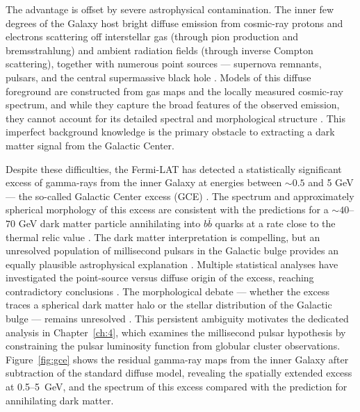 The advantage is offset by severe astrophysical contamination.
The inner few degrees of the Galaxy host bright diffuse emission from cosmic-ray protons and electrons scattering off interstellar gas (through pion production and bremsstrahlung) and ambient radiation fields (through inverse Compton scattering), together with numerous point sources --- supernova remnants, pulsars, and the central supermassive black hole \cite{Hooper:2024,Cirelli:2024ssz}.
Models of this diffuse foreground are constructed from gas maps and the locally measured cosmic-ray spectrum, and while they capture the broad features of the observed emission, they cannot account for its detailed spectral and morphological structure \cite{Hooper:2024}.
This imperfect background knowledge is the primary obstacle to extracting a dark matter signal from the Galactic Center.

Despite these difficulties, the Fermi-LAT has detected a statistically significant excess of gamma-rays from the inner Galaxy at energies between $\sim 0.5$ and 5 GeV --- the so-called Galactic Center excess (GCE) \cite{Goodenough:2009gk,Hooper:2010mq,Daylan:2014rsa,Cirelli:2024ssz}.
The spectrum and approximately spherical morphology of this excess are consistent with the predictions for a $\sim 40$--$70$ GeV dark matter particle annihilating into $b\bar{b}$ quarks at a rate close to the thermal relic value \cite{Cirelli:2024ssz,Daylan:2014rsa}.
The dark matter interpretation is compelling, but an unresolved population of millisecond pulsars in the Galactic bulge provides an equally plausible astrophysical explanation \cite{Cirelli:2024ssz,Pinetti:2021jjs}.
Multiple statistical analyses have investigated the point-source versus diffuse origin of the excess, reaching contradictory conclusions \cite{Cirelli:2024ssz}.
The morphological debate --- whether the excess traces a spherical dark matter halo or the stellar distribution of the Galactic bulge --- remains unresolved \cite{Cirelli:2024ssz}.
This persistent ambiguity motivates the dedicated analysis in Chapter~\ref{ch:4}, which examines the millisecond pulsar hypothesis by constraining the pulsar luminosity function from globular cluster observations.
Figure~\ref{fig:gce} shows the residual gamma-ray maps from the inner Galaxy after subtraction of the standard diffuse model, revealing the spatially extended excess at 0.5--5~GeV, and the spectrum of this excess compared with the prediction for annihilating dark matter.

